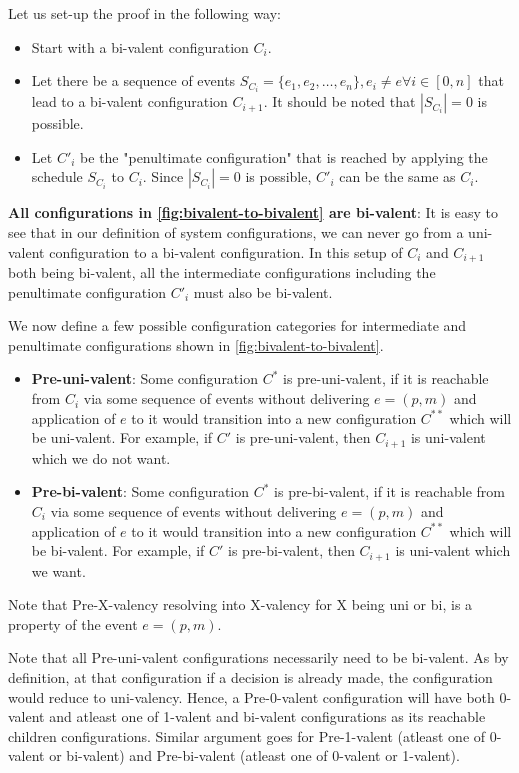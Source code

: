 Let us set-up the proof in the following way:
\begin{itemize}
    \item Start with a bi-valent configuration $C_i$.
    \item Let there be a sequence of events $S_{C_i} = \{e_1, e_2, \ldots, e_n\}, e_i \ne e \forall i \in [0, n]$ that lead to a bi-valent configuration $C_{i+1}$. It should be noted that $|S_{C_i}| = 0$ is possible.
    \item Let $C'_{i}$ be the "penultimate configuration" that is reached by applying the schedule $S_{C_i}$ to $C_i$. Since $|S_{C_i}| = 0$ is possible, $C'_{i}$ can be the same as $C_i$.
\end{itemize}

\textbf{All configurations in \ref{fig:bivalent-to-bivalent} are bi-valent}: It is easy to see that in our definition of system configurations, we can never go from a uni-valent configuration to a bi-valent configuration. In this setup of $C_i$ and $C_{i+1}$ both being bi-valent, all the intermediate configurations including the penultimate configuration $C'_{i}$ must also be bi-valent.

We now define a few possible configuration categories for intermediate and penultimate configurations shown in \ref{fig:bivalent-to-bivalent}.

\begin{itemize}
    \item \textbf{Pre-uni-valent}: Some configuration $C^*$ is pre-uni-valent, if it is reachable from $C_i$ via some sequence of events without delivering $e = (p, m)$ and application of $e$ to it would transition into a new configuration $C^{**}$ which will be uni-valent. For example, if $C'$ is pre-uni-valent, then $C_{i+1}$ is uni-valent which we do not want.
    \item \textbf{Pre-bi-valent}: Some configuration $C^*$ is pre-bi-valent, if it is reachable from $C_i$ via some sequence of events without delivering $e = (p, m)$ and application of $e$ to it would transition into a new configuration $C^{**}$ which will be bi-valent. For example, if $C'$ is pre-bi-valent, then $C_{i+1}$ is uni-valent which we want.
\end{itemize}

Note that Pre-X-valency resolving into X-valency for X being uni or bi, is a property of the event $e = (p, m)$.

Note that all Pre-uni-valent configurations necessarily need to be bi-valent. As by definition, at that configuration if a decision is already made, the configuration would reduce to uni-valency. Hence, a Pre-0-valent configuration will have both 0-valent and atleast one of 1-valent and bi-valent configurations as its reachable children configurations. Similar argument goes for Pre-1-valent (atleast one of 0-valent or bi-valent) and Pre-bi-valent (atleast one of 0-valent or 1-valent).

